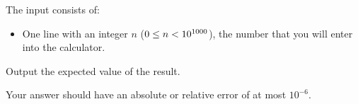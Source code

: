 \begin{Input}
    The input consists of:
    \begin{itemize}
        \item One line with an integer $n$ ($0 \leq n < 10^{1000}$), the number that you will enter into the calculator.
    \end{itemize}
\end{Input}

\begin{Output}
    Output the expected value of the result.

    Your answer should have an absolute or relative error of at most $10^{-6}$.
\end{Output}
